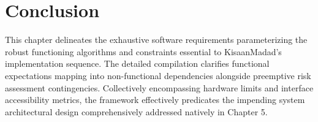 \section{Conclusion}

This chapter delineates the exhaustive software requirements parameterizing the robust functioning algorithms and constraints essential to KisaanMadad's implementation sequence. The detailed compilation clarifies functional expectations mapping into non-functional dependencies alongside preemptive risk assessment contingencies. Collectively encompassing hardware limits and interface accessibility metrics, the framework effectively predicates the impending system architectural design comprehensively addressed natively in Chapter 5.
